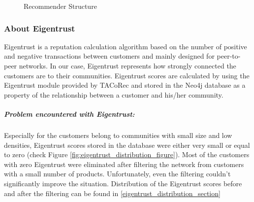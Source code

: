 \label{eigentrust_section}
	\begin{figure}[H]
		\centering
		\caption{Recommender Structure}
		\label{fig:eigentrust_structure}
	\end{figure}
	\subsubsection{About Eigentrust} \label{about_eigentrust}
	Eigentrust\cite{Eigentrust} is a reputation calculation algorithm based on the number of positive and negative transactions between customers and mainly designed for peer-to-peer networks. In our case, Eigentrust represents how strongly connected the customers are to their communities. Eigentrust scores are calculated by using the Eigentrust module provided by TACoRec and stored in the Neo4j database as a property of the relationship between a customer and his/her community. 
	\subparagraph{Problem encountered with Eigentrust:}
	Especially for the customers belong to communities with small size and low densities, Eigentrust scores stored in the database were either very small or equal to zero (check Figure \ref{fig:eigentrust_distribution_figure}). Most of the customers with zero Eigentrust were eliminated after filtering the network from customers with a small number of products. Unfortunately, even the filtering couldn't significantly improve the situation. Distribution of the Eigentrust scores before and after the filtering can be found in \ref{eigentrust_distribution_section}

